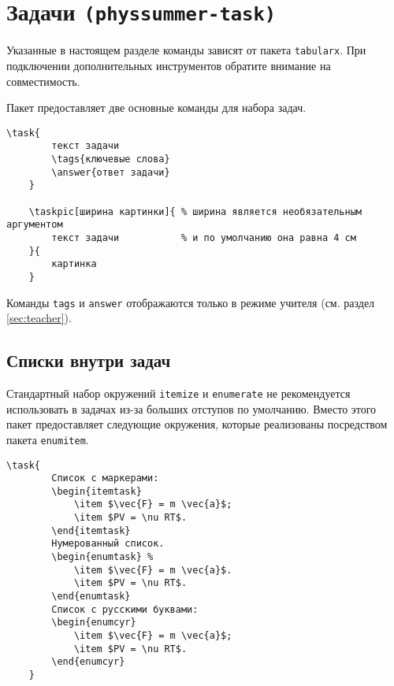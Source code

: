 \section{Задачи \texttt{(physsummer-task)}}

Указанные в настоящем разделе команды зависят от пакета \texttt{tabularx}. При подключении дополнительных
инструментов обратите внимание на совместимость.

Пакет предоставляет две основные команды для набора задач.

\begin{lstlisting}[gobble = 4]
    \task{
        текст задачи
        \tags{ключевые слова}
        \answer{ответ задачи}
    }

    \taskpic[ширина картинки]{ % ширина является необязательным аргументом
        текст задачи           % и по умолчанию она равна 4 см
    }{
        картинка
    }
\end{lstlisting}

Команды \texttt{tags} и \texttt{answer} отображаются только в режиме учителя (см. раздел
\ref{sec:teacher}).


        
\subsection{Списки внутри задач}

Стандартный набор окружений \texttt{itemize} и \texttt{enumerate} не рекомендуется использовать в
задачах из-за больших отступов по умолчанию. Вместо этого пакет предоставляет следующие окружения,
которые реализованы посредством пакета \texttt{enumitem}.

\begin{lstlisting}[gobble = 3]
    \task{
        Список с маркерами:
        \begin{itemtask}
            \item $\vec{F} = m \vec{a}$;
            \item $PV = \nu RT$.
        \end{itemtask}
        Нумерованный список.
        \begin{enumtask} % 
            \item $\vec{F} = m \vec{a}$.
            \item $PV = \nu RT$.
        \end{enumtask}
        Список с русскими буквами:
        \begin{enumcyr}
            \item $\vec{F} = m \vec{a}$;
            \item $PV = \nu RT$.
        \end{enumcyr}
    }
\end{lstlisting}

